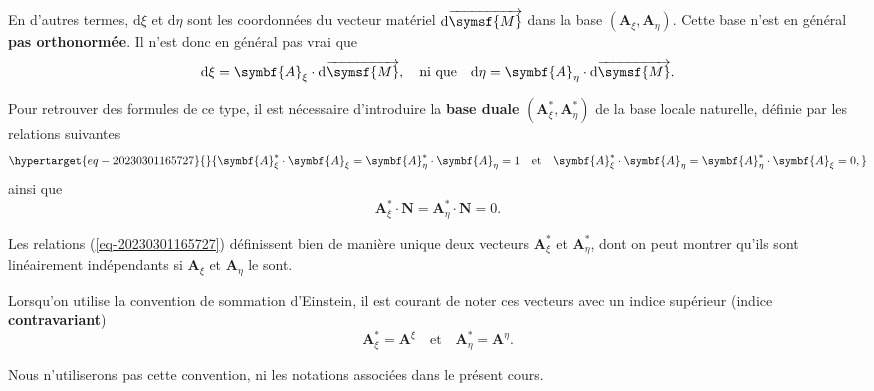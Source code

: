 \documentclass[
  a4paper,
  DIV=11,
  numbers=noendperiod]{scrreprt}
\newcommand{\altvec}[1]{\overrightarrow{#1}}
\newcommand{\D}{{\mathrm d}}
\newcommand{\point}[1]{\symsf{#1}}
\renewcommand{\vec}[1]{\symbf{#1}}
\begin{document}
En d'autres termes, \(\D\xi\) et \(\D\eta\) sont les coordonnées du
vecteur matériel \(\D\altvec{\point{M}}\) dans la base
\((\vec{A}_\xi, \vec{A}_\eta)\). Cette base n'est en général \textbf{pas
orthonormée}. Il n'est donc en général pas vrai que \[
\D \xi = \vec{A}_\xi \cdot \D \altvec{\point{M}}, \quad \text{ni que} \quad \D \eta = \vec{A}_\eta \cdot \D \altvec{\point{M}}.
\]

Pour retrouver des formules de ce type, il est nécessaire d'introduire
la \textbf{base duale} \((\vec{A}_\xi^\ast, \vec{A}_\eta^\ast)\) de la
base locale naturelle, définie par les relations suivantes
\begin{equation}\protect\hypertarget{eq-20230301165727}{}{
\vec{A}_\xi^\ast \cdot \vec{A}_\xi = \vec{A}_\eta^\ast \cdot \vec{A}_\eta = 1
\quad \text{et} \quad
\vec{A}_\xi^\ast \cdot \vec{A}_\eta = \vec{A}_\eta^\ast \cdot \vec{A}_\xi = 0,
}\label{eq-20230301165727}\end{equation} ainsi que \[
\vec{A}_\xi^\ast \cdot \vec{N} = \vec{A}_\eta^\ast \cdot \vec{N} = 0.
\]

\begin{tcolorbox}[enhanced jigsaw, toprule=.15mm, breakable, left=2mm, rightrule=.15mm, colbacktitle=quarto-callout-note-color!10!white, colframe=quarto-callout-note-color-frame, title=\textcolor{quarto-callout-note-color}{\faInfo}\hspace{0.5em}{Note}, bottomtitle=1mm, arc=.35mm, coltitle=black, opacityback=0, leftrule=.75mm, titlerule=0mm, toptitle=1mm, bottomrule=.15mm, opacitybacktitle=0.6, colback=white]

Les relations (\ref{eq-20230301165727}) définissent bien de manière
unique deux vecteurs \(\vec{A}_\xi^\ast\) et \(\vec{A}_\eta^\ast\), dont
on peut montrer qu'ils sont linéairement indépendants si \(\vec{A}_\xi\)
et \(\vec{A}_\eta\) le sont.

Lorsqu'on utilise la convention de sommation d'Einstein, il est courant
de noter ces vecteurs avec un indice supérieur (indice
\textbf{contravariant}) \[
\vec{A}_\xi^\ast = \vec{A}^\xi \quad \text{et} \quad \vec{A}_\eta^\ast = \vec{A}^\eta.
\]

Nous n'utiliserons pas cette convention, ni les notations associées dans
le présent cours.

\end{tcolorbox}
\end{document}
